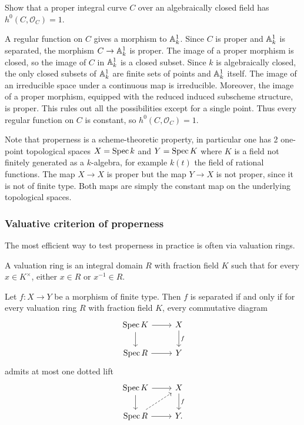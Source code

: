 \documentclass[12pt]{article}
\begin{document}
\begin{exercise}
    Show that a proper integral curve $C$ over an algebraically closed field has $h^0(C,\mathcal O_C)=1$.
\end{exercise}

\begin{solution}
    A regular function on $C$ gives a morphism to $\mathbb{A}^1_k$. Since $C$ is proper and $\mathbb{A}^1_k$ is separated, the morphism $C\to \mathbb{A}^1_k$ is proper. The image of a proper morphism is closed, so the image of $C$ in $\mathbb{A}^1_k$ is a closed subset. Since $k$ is algebraically closed, the only closed subsets of $\mathbb{A}^1_k$ are finite sets of points and $\mathbb{A}^1_k$ itself. The image of an irreducible space under a continuous map is irreducible. Moreover, the image of a proper morphism, equipped with the reduced induced subscheme structure, is proper. This rules out all the possibilities except for a single point. Thus every regular function on $C$ is constant, so $h^0(C,\mathcal O_C)=1$.
\end{solution}

\begin{remark}
    Note that properness is a scheme-theoretic property, in particular one has 2 one-point topological spaces $X = \operatorname{Spec} k$ and $Y = \operatorname{Spec} K$ where $K$ is a field not finitely generated as a $k$-algebra, for example $k(t)$ the field of rational functions. The map $X\to X$ is proper but the map $Y \to X$ is not proper, since it is not of finite type. Both maps are simply the constant map on the underlying topological spaces.
\end{remark}
\subsubsection{Valuative criterion of properness}

The most efficient way to test properness in practice is often via valuation rings.

\begin{definition}
    A valuation ring is an integral domain $R$ with fraction field $K$ such that for every $x\in K^{\times}$, either $x\in R$ or $x^{-1}\in R$.
\end{definition}

\begin{theorem}
    Let $f:X\to Y$ be a morphism of finite type. Then $f$ is separated if and only if for every valuation ring $R$ with fraction field $K$, every commutative diagram
    \[
        \begin{tikzcd}
            \Spec K \arrow[r] \arrow[d] & X \arrow[d, "f"] \\
            \Spec R \arrow[r] & Y
        \end{tikzcd}
    \]
    admits at most one dotted lift
    \[
        \begin{tikzcd}
            \Spec K \arrow[r] \arrow[d] & X \arrow[d, "f"] \\
            \Spec R \arrow[r] \arrow[ur, dashed] & Y.
        \end{tikzcd}
    \]
\end{theorem}
\end{document}
